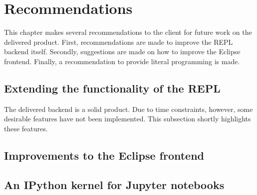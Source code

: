 \chapter{Recommendations}
\label{cha:recommendations}

This chapter makes several recommendations to the client for future work on the
delivered product. First, recommendations are made to improve the REPL backend
itself. Secondly, suggestions are made on how to improve the Eclipse frontend.
Finally, a recommendation to provide literal programming is made.

\section{Extending the functionality of the REPL}
\label{sec:impr-backend}

The delivered backend is a solid product. Due to time constraints, however, some
desirable features have not been implemented. This subsection shortly highlights
these features.





\section{Improvements to the Eclipse frontend}
\label{sec:impr-eclipse}



\section{An IPython kernel for Jupyter notebooks}
\label{sec:discuss-literate-programming}



